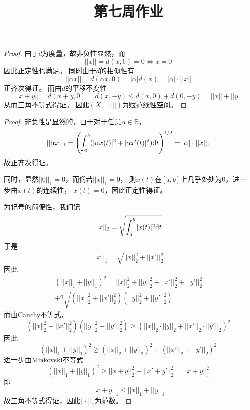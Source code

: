 \documentclass[cn]{homework}
\title{第七周作业}
\begin{document}
    \maketitle

    \problem
    \begin{proof}
        由于$d$为度量，故非负性显然，而
        \[||x||=d(x,0)=0\Leftrightarrow x=0\]
        因此正定性也满足。
        同时由于$d$的相似性有
        \[||\alpha x||=d(\alpha x,0)=|\alpha|d(x)
        =|\alpha|\cdot||x||\]
        正齐次得证。
        而由$d$的平移不变性
        \[||x+y||=d(x+y,0)=d(x,-y)
        \leq d(x,0)+d(0,-y)=||x||+||y||\]
        从而三角不等式得证。
        因此$(X,||\cdot||)$为赋范线性空间。
    \end{proof}

    \problem
    \begin{subproblem}
        \item
        \begin{proof}
            非负性是显然的，由于对于任意$\alpha\in\mathbb R$，
            \[||\alpha x||_1=
            \left(\int_a^b(|\alpha x(t)|^2+|\alpha x'(t)|^2)\mathrm d t\right)^{1/2}
            =|\alpha|\cdot||x||_1\]
            故正齐次得证。

            同时，显然$||0||_1=0$，而倘若$||x||_1=0$，
            则$x(t)$在$[a,b]$上几乎处处为0，进一步由$x(t)$的连续性，
            $x(t)=0$，因此正定性得证。

            为记号的简便性，我们记
            \[||x||_2=\sqrt{\int_a^b|x(t)|^2\mathrm d t}\]
            于是
            \[||x||_1=\sqrt{||x||_2^2+||x'||_2^2}\]
            因此
            \begin{multline*}
            (||x||_1+||y||_1)^2=
            ||x||_2^2+||y||_2^2
            +||x'||_2^2+||y'||_2^2\\
            +2\sqrt{(||x||_2^2+||x'||_2^2)(||y||_2^2+||y'||_2^2)}
            \end{multline*}
            而由Cauchy不等式，
            \[(||x||_2^2+||x'||_2^2)(||y||_2^2+||y'||_2^2)
            \geq(||x||_2\cdot||y||_2+||x'||_2\cdot||y'||_2)^2\]
            因此
            \[(||x||_1+||y||_1)^2
            \geq(||x||_2+||y||_2)^2+(||x'||_2+||y'||_2)^2\]
            进一步由Minkovski不等式
            \[(||x||_1+||y||_1)^2\geq ||x+y||_2^2+||x'+y'||_2^2
            =||x+y||_1^2\]
            即
            \[||x+y||_1\leq||x||_1+||y||_1\]
            故三角不等式得证，因此$||\cdot||_1$为范数。
        \end{proof}
    \end{subproblem}
\end{document}
